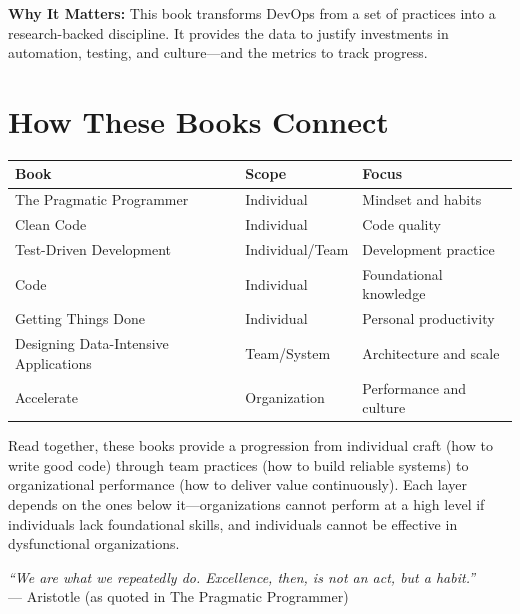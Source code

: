 \documentclass[11pt, letterpaper]{article}
\begin{document}
\textbf{Why It Matters:} This book transforms DevOps from a set of practices into a research-backed discipline. It provides the data to justify investments in automation, testing, and culture---and the metrics to track progress.

\vspace{1.5em}

\section*{How These Books Connect}

\begin{center}
\begin{tabular}{lll}
\toprule
\textbf{Book} & \textbf{Scope} & \textbf{Focus} \\
\midrule
The Pragmatic Programmer & Individual & Mindset and habits \\
Clean Code & Individual & Code quality \\
Test-Driven Development & Individual/Team & Development practice \\
Code & Individual & Foundational knowledge \\
Getting Things Done & Individual & Personal productivity \\
Designing Data-Intensive Applications & Team/System & Architecture and scale \\
Accelerate & Organization & Performance and culture \\
\bottomrule
\end{tabular}
\end{center}

\vspace{0.5em}

Read together, these books provide a progression from individual craft (how to write good code) through team practices (how to build reliable systems) to organizational performance (how to deliver value continuously). Each layer depends on the ones below it---organizations cannot perform at a high level if individuals lack foundational skills, and individuals cannot be effective in dysfunctional organizations.

\vspace{1em}

\begin{center}
\textit{``We are what we repeatedly do. Excellence, then, is not an act, but a habit.''}\\[0.3em]
--- Aristotle (as quoted in The Pragmatic Programmer)
\end{center}
\end{document}
